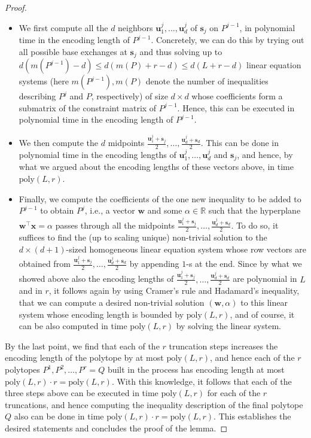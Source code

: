 \documentclass[centering,11pt,reqno]{amsart}
\theoremstyle{definition}
\begin{document}
\begin{proof}
\begin{itemize}
    \item We first compute all the $d$ neighbors $\mathbf{u}_1^j,\ldots,\mathbf{u}_d^j$ of $\mathbf{s}_j$ on $P^{j-1}$, in polynomial time in the encoding length of $P^{j-1}$. Concretely, we can do this by trying out all possible base exchanges at $\mathbf{s}_j$ and thus solving up to $d(m(P^{j-1})-d)\le d(m(P)+r-d)\le d(L+r-d)$ linear equation systems (here $m(P^{j-1}), m(P)$ denote the number of inequalities describing $P^j$ and $P$, respectively) of size $d\times d$ whose coefficients form a submatrix of the constraint matrix of $P^{j-1}$. Hence, this can be executed in polynomial time in the encoding length of $P^{j-1}$.
    \item We then compute the $d$ midpoints $\frac{\mathbf{u}_1^j+\mathbf{s}_j}{2},\ldots,\frac{\mathbf{u}_d^j+\mathbf{s}_d}{2}$. This can be done in polynomial time in the encoding lengths of $\mathbf{u}_1^j,\ldots,\mathbf{u}_d^j$ and $\mathbf{s}_j$, and hence, by what we argued about the encoding lengths of these vectors above, in time $\mathrm{poly}(L,r)$.
    \item Finally, we compute the coefficients of the one new inequality to be added to $P^{j-1}$ to obtain $P^{j}$, i.e., a vector $\mathbf{w}$ and some $\alpha\in \mathbb{R}$ such that the hyperplane $\mathbf{w}^\intercal \mathbf{x}=\alpha$ passes through all the midpoints $\frac{\mathbf{u}_1^j+\mathbf{s}_j}{2},\ldots,\frac{\mathbf{u}_d^j+\mathbf{s}_d}{2}$. To do so, it suffices to find the (up to scaling unique) non-trivial solution to the $d\times (d+1)$-sized homogeneous linear equation system whose row vectors are obtained from $\frac{\mathbf{u}_1^j+\mathbf{s}_j}{2},\ldots,\frac{\mathbf{u}_d^j+\mathbf{s}_d}{2}$ by appending $1$-s at the end. Since by what we showed above also the encoding lengths of $\frac{\mathbf{u}_1^j+\mathbf{s}_j}{2},\ldots,\frac{\mathbf{u}_d^j+\mathbf{s}_d}{2}$ are polynomial in $L$ and in $r$, it follows again by using Cramer's rule and Hadamard's inequality, that we can compute a desired non-trivial solution $(\mathbf{w},\alpha)$ to this linear system whose encoding length is bounded by $\mathrm{poly}(L,r)$, and of course, it can be also computed in time $\mathrm{poly}(L,r)$ by solving the linear system.
\end{itemize}

By the last point, we find that each of the $r$ truncation steps increases the encoding length of the polytope by at most $\mathrm{poly}(L,r)$, and hence each of the $r$ polytopes $P^{1}, P^{2},\dots,P^{r} = Q$ built in the process has encoding length at most $\mathrm{poly}(L,r)\cdot r=\mathrm{poly}(L,r)$. With this knowledge, it follows that each of the three steps above can be executed in time $\mathrm{poly}(L,r)$ for each of the $r$ truncations, and hence computing the inequality description of the final polytope $Q$ also can be done in time $\mathrm{poly}(L,r)\cdot r=\mathrm{poly}(L,r)$. This establishes the desired statements and concludes the proof of the lemma.
\end{proof}
\end{document}
